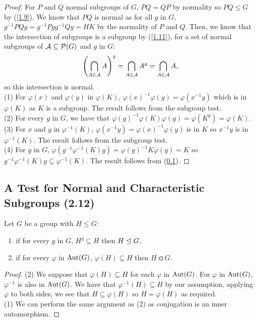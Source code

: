 \begin{proof}
    For $P$ and $Q$ normal subgroups of $G$, $PQ = QP$ by normality so
    $PQ \leq G$ by (\ref{1.9}). We know that $PQ$ is normal as for all $g$ in $G$,
    $g^{-1}PQg = g^{-1}Pgg^{-1}Qg = HK$ by the normality of $P$ and $Q$.
    Then, we know that the intersection of subgroups is a subgroup by (\ref{1.11}),
    for a set of normal subgroups of $\mathcal{A} \subseteq \mathcal{P}(G)$ and $g$ in $G$: \begin{align*}
        \left( \bigcap_{A \in \mathcal{A}}A \right)^g
        = \bigcap_{A \in \mathcal{A}} A^g
        = \bigcap_{A \in \mathcal{A}} A,
    \end{align*} so this intersection is normal.
    \\[\baselineskip]
    (1) For $\varphi(x)$ and $\varphi(y)$ in $\varphi(K)$, 
    $\varphi(x)^{-1}\varphi(y) = \varphi(x^{-1}y)$ which is in $\varphi(K)$ as $K$ is
    a subgroup. The result follows from the subgroup test.
    \\[\baselineskip]
    (2) For every $g$ in $G$, we have that 
    $\varphi(g)^{-1}\varphi(K)\varphi(g) = \varphi(K^g) = \varphi(K)$.
    \\[\baselineskip]
    (3) For $x$ and $y$ in $\varphi^{-1}(K)$, $\varphi(x^{-1}y) = \varphi(x)^{-1}\varphi(y)$
    is in $K$ so $x^{-1}y$ is in $\varphi^{-1}(K)$. The result follows from the subgroup test.
    \\[\baselineskip]
    (4) For $g$ in $G$, $\varphi(g^{-1}\varphi^{-1}(K)g) = \varphi(g)^{-1}K\varphi(g) = K$
    so $g^{-1}\varphi^{-1}(K)g \subseteq \varphi^{-1}(K)$. The result follows from (\ref{2.12}).
\end{proof}

\subsection{A Test for Normal and Characteristic Subgroups (2.12)} \label{2.12}

Let $G$ be a group with $H \leq G$: \begin{enumerate}
    \item if for every $g$ in $G$, $H^g \subseteq H$ then $H \trianglelefteq G$,
    \item if for every $\varphi$ in $\operatorname{Aut}(G)$, $\varphi(H) \subseteq H$ 
        then $H \csub G$.
\end{enumerate}

\begin{proof}
    (2) We suppose that $\varphi(H) \subseteq H$ for each $\varphi$ in $\operatorname{Aut}(G)$.
    For $\varphi$ in $\operatorname{Aut}(G)$, $\varphi^{-1}$ is also in $\operatorname{Aut}(G)$. 
    We have that $\varphi^{-1}(H) \subseteq H$ by our assumption, 
    applying $\varphi$ to both sides, we see that
    $H \subseteq \varphi(H)$ so $H = \varphi(H)$ as required.
    \\[\baselineskip]
    (1) We can perform the same argument as (2) as conjugation is an inner
    automorphism.
\end{proof}

